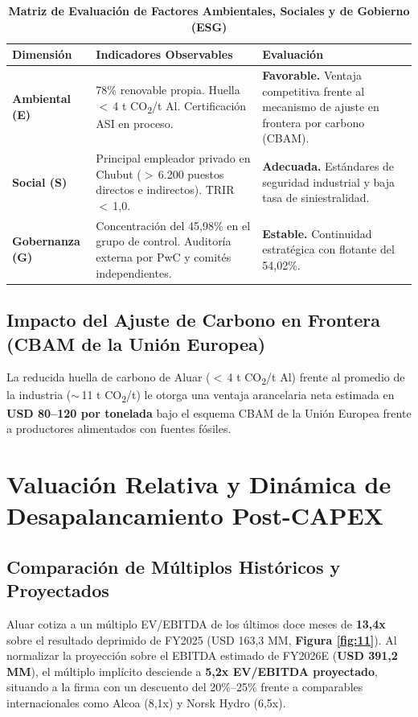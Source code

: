 \documentclass[10pt,a4paper]{article}
\begin{document}
\begin{table}[H]
\centering
\caption{\textbf{Matriz de Evaluación de Factores Ambientales, Sociales y de Gobierno (ESG)}}
\scriptsize
\begin{tabularx}{\textwidth}{p{2.5cm}Xp{4.2cm}}
\toprule
\textbf{Dimensión} & \textbf{Indicadores Observables} & \textbf{Evaluación} \\
\midrule
\textbf{Ambiental (E)} & 78\% renovable propia. Huella $<$\,4 t CO\textsubscript{2}/t Al. Certificación ASI en proceso. & \textbf{Favorable.} Ventaja competitiva frente al mecanismo de ajuste en frontera por carbono (CBAM). \\
\textbf{Social (S)} & Principal empleador privado en Chubut ($>$\,6.200 puestos directos e indirectos). TRIR $<$\,1,0. & \textbf{Adecuada.} Estándares de seguridad industrial y baja tasa de siniestralidad. \\
\textbf{Gobernanza (G)} & Concentración del 45,98\% en el grupo de control. Auditoría externa por PwC y comités independientes. & \textbf{Estable.} Continuidad estratégica con flotante del 54,02\%. \\
\bottomrule
\end{tabularx}
\end{table}

\subsection{Impacto del Ajuste de Carbono en Frontera (CBAM de la Unión Europea)}
La reducida huella de carbono de Aluar ($<$\,4 t CO\textsubscript{2}/t Al) frente al promedio de la industria ($\sim$\,11 t CO\textsubscript{2}/t) le otorga una ventaja arancelaria neta estimada en \textbf{USD 80--120 por tonelada} bajo el esquema CBAM de la Unión Europea frente a productores alimentados con fuentes fósiles.

\section{Valuación Relativa y Dinámica de Desapalancamiento Post-CAPEX}

\subsection{Comparación de Múltiplos Históricos y Proyectados}
Aluar cotiza a un múltiplo EV/EBITDA de los últimos doce meses de \textbf{13,4x} sobre el resultado deprimido de FY2025 (USD 163,3 MM, \textbf{Figura \ref{fig:11}}). Al normalizar la proyección sobre el EBITDA estimado de FY2026E (\textbf{USD 391,2 MM}), el múltiplo implícito desciende a \textbf{5,2x EV/EBITDA proyectado}, situando a la firma con un descuento del 20\%--25\% frente a comparables internacionales como Alcoa (8,1x) y Norsk Hydro (6,5x).
\end{document}
